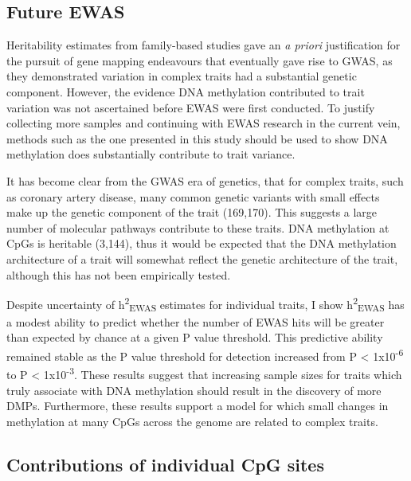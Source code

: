 \documentclass[11pt,oneside]{bristolthesis}
\begin{document}
\hypertarget{future-ewas-05}{%
\subsection{Future EWAS}\label{future-ewas-05}}

Heritability estimates from family-based studies gave an \emph{a priori} justification for the pursuit of gene mapping endeavours that eventually gave rise to GWAS, as they demonstrated variation in complex traits had a substantial genetic component. However, the evidence DNA methylation contributed to trait variation was not ascertained before EWAS were first conducted. To justify collecting more samples and continuing with EWAS research in the current vein, methods such as the one presented in this study should be used to show DNA methylation does substantially contribute to trait variance.

It has become clear from the GWAS era of genetics, that for complex traits, such as coronary artery disease, many common genetic variants with small effects make up the genetic component of the trait (169,170). This suggests a large number of molecular pathways contribute to these traits. DNA methylation at CpGs is heritable (3,144), thus it would be expected that the DNA methylation architecture of a trait will somewhat reflect the genetic architecture of the trait, although this has not been empirically tested.

Despite uncertainty of h\textsuperscript{2}\textsubscript{EWAS} estimates for individual traits, I show h\textsuperscript{2}\textsubscript{EWAS} has a modest ability to predict whether the number of EWAS hits will be greater than expected by chance at a given P value threshold. This predictive ability remained stable as the P value threshold for detection increased from P \textless{} 1x10\textsuperscript{-6} to P \textless{} 1x10\textsuperscript{-3}. These results suggest that increasing sample sizes for traits which truly associate with DNA methylation should result in the discovery of more DMPs. Furthermore, these results support a model for which small changes in methylation at many CpGs across the genome are related to complex traits.

\hypertarget{contribution-of-individual-cpg-sites}{%
\subsection{Contributions of individual CpG sites}\label{contribution-of-individual-cpg-sites}}
\end{document}
